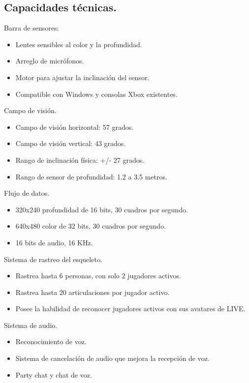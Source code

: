 \documentclass[11pt,a4paper]{article}
\begin{document}
\subsection{Capacidades técnicas.} %
Barra de sensores:
\begin{itemize} %
\item Lentes sensibles al color y la profundidad.
\item Arreglo de micrófonos.
\item Motor para ajustar la inclinación del sensor.
\item Compatible con Windows y consolas Xbox existentes.
\end{itemize}
Campo de visión.
\begin{itemize} 
\item Campo de visión horizontal: 57 grados.
\item Campo de visión vertical: 43 grados.
\item Rango de inclinación física: +/- 27 grados.
\item Rango de sensor de profundidad:  1.2 a 3.5 metros.
\end{itemize}
Flujo de datos. 
\begin{itemize} 
\item 320x240  profundidad de 16 bits, 30 cuadros por segundo.
\item 640x480 color de 32 bits, 30 cuadros por segundo.
\item 16 bits de audio, 16 KHz.
\end{itemize}
Sistema de rastreo del esqueleto.
\begin{itemize} 
\item Rastrea hasta 6 personas, con solo 2 jugadores activos.
\item Rastrea hasta 20 articulaciones por jugador activo.
\item Posee la habilidad de reconocer jugadores activos con sus avatares de LIVE.
\end{itemize}
Sistema de audio.
\begin{itemize} 
\item Reconocimiento de voz.
\item Sistema de cancelación de audio que mejora la recepción de voz.
\item Party chat y chat de voz.
\end{itemize}
\end{document}

